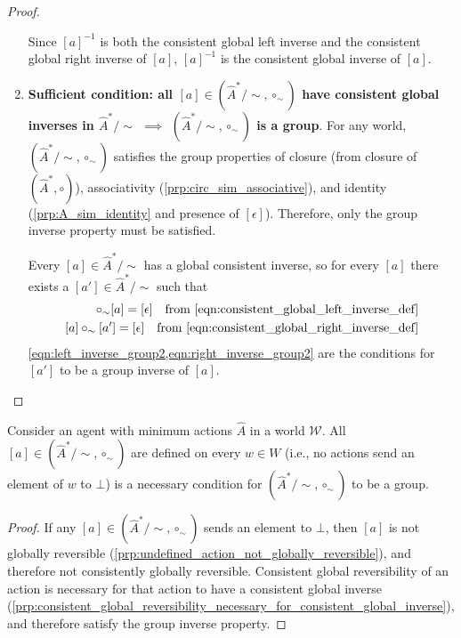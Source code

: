 \begin{proof}
\begin{enumerate}[(1)]
    Since $[a]^{-1}$ is both the consistent global left inverse and the consistent global right inverse of $[a]$, $[a]^{-1}$ is the consistent global inverse of $[a]$.


    \item \textbf{Sufficient condition: all $[a] \in (\hat{A}^{*}/\sim, \circ_{\sim})$ have consistent global inverses in $\hat{A}^{*}/\sim$ $\implies$ $(\hat{A}^{*}/\sim, \circ_{\sim})$ is a group}.
    For any world, $(\hat{A}^{*}/\sim, \circ_{\sim})$ satisfies the group properties of closure (from closure of $(\hat{A}^{*}, \circ)$), associativity (\cref{prp:circ_sim_associative}), and identity (\cref{prp:A_sim_identity} and presence of $[\epsilon]$).
    Therefore, only the group inverse property must be satisfied.
    
    Every $[a] \in \hat{A}^{*}/\sim$ has a global consistent inverse, so for every $[a]$ there exists a $[a'] \in \hat{A}^{*}/\sim$ such that
    \begin{align}
        [a'] \circ_{\sim} [a] = [\epsilon] \quad \text{from \cref{eqn:consistent_global_left_inverse_def}}
        \label{eqn:left_inverse_group2} \\
        [a] \circ_{\sim} [a'] = [\epsilon] \quad \text{from \cref{eqn:consistent_global_right_inverse_def}}
        \label{eqn:right_inverse_group2}
    \end{align}
    \cref{eqn:left_inverse_group2,eqn:right_inverse_group2} are the conditions for $[a']$ to be a group inverse of $[a]$.
\end{enumerate}
\end{proof}




\begin{proposition}
    Consider an agent with minimum actions $\hat{A}$ in a world $\mathscr{W}$.
    All $[a] \in (\hat{A}^{*}/\sim, \circ_{\sim})$ are defined on every $w \in W$ (i.e., no actions send an element of $w$ to $\bot$) is a necessary condition for $(\hat{A}^{*}/\sim, \circ_{\sim})$ to be a group.
\end{proposition}
\begin{proof}
    If any $[a] \in (\hat{A}^{*}/\sim, \circ_{\sim})$ sends an element to $\bot$, then $[a]$ is not globally reversible (\cref{prp:undefined_action_not_globally_reversible}), and therefore not consistently globally reversible.
    Consistent global reversibility of an action is necessary for that action to have a consistent global inverse (\cref{prp:consistent_global_reversibility_necessary_for_consistent_global_inverse}), and therefore satisfy the group inverse property.
\end{proof}

